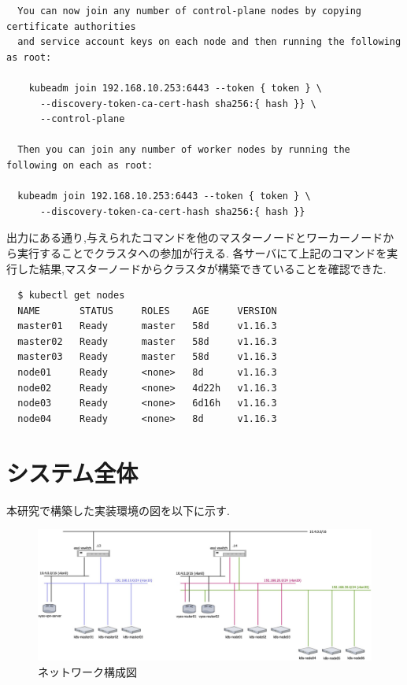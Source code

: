 \begin{lstlisting}
  You can now join any number of control-plane nodes by copying certificate authorities
  and service account keys on each node and then running the following as root:

    kubeadm join 192.168.10.253:6443 --token { token } \
      --discovery-token-ca-cert-hash sha256:{ hash }} \
      --control-plane

  Then you can join any number of worker nodes by running the following on each as root:

  kubeadm join 192.168.10.253:6443 --token { token } \
      --discovery-token-ca-cert-hash sha256:{ hash }}
\end{lstlisting}

出力にある通り,与えられたコマンドを他のマスターノードとワーカーノードから実行することでクラスタへの参加が行える.
各サーバにて上記のコマンドを実行した結果,マスターノードからクラスタが構築できていることを確認できた.

\begin{lstlisting}
  $ kubectl get nodes
  NAME       STATUS     ROLES    AGE     VERSION
  master01   Ready      master   58d     v1.16.3
  master02   Ready      master   58d     v1.16.3
  master03   Ready      master   58d     v1.16.3
  node01     Ready      <none>   8d      v1.16.3
  node02     Ready      <none>   4d22h   v1.16.3
  node03     Ready      <none>   6d16h   v1.16.3
  node04     Ready      <none>   8d      v1.16.3
\end{lstlisting}

\section{システム全体}
\label{implementation:system}
本研究で構築した実装環境の図を以下に示す.

\begin{landscape}
  \begin{figure}[htbp]
    \begin{center}
      \includegraphics[width=\textwidth]{./figures/network-diagram.jpg}
      \caption{ネットワーク構成図}
    \end{center}
  \end{figure}
\end{landscape}

